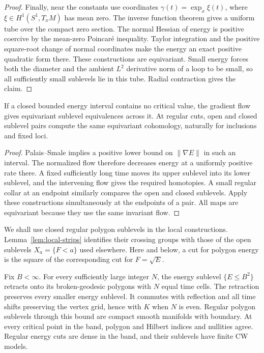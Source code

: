 \begin{proof}
Finally, near the constants use coordinates
\(\gamma(t)=\exp_x \xi(t)\), where \(\xi\in H^1(S^1,T_xM)\) has mean
zero.  The inverse function theorem gives a uniform tube over the
compact zero section.  The normal Hessian of energy is positive
coercive by the mean-zero Poincar\'e inequality.  Taylor integration
and the positive square-root change of normal coordinates make the
energy an exact positive quadratic form there.  These constructions
are equivariant.  Small energy forces both the diameter and the
ambient \(L^2\) derivative norm of a loop to be small, so all sufficiently
small sublevels lie in this tube.  Radial contraction gives the claim.
\end{proof}

\begin{lemma}\label{lem:local-strips}
If a closed bounded energy interval contains no critical value, the
gradient flow gives equivariant sublevel equivalences across it.  At
regular cuts, open and closed sublevel pairs compute the same
equivariant cohomology, naturally for inclusions and fixed loci.
\end{lemma}

\begin{proof}
Palais--Smale implies a positive lower bound on \(\|\nabla E\|\) in
such an interval.  The normalized flow therefore decreases energy at
a uniformly positive rate there.  A fixed sufficiently long time
moves its upper sublevel into its lower sublevel, and the intervening
flow gives the required homotopies.  A small regular collar at an
endpoint similarly compares the open and closed sublevels.  Apply
these constructions simultaneously at the endpoints of a pair.
All maps are equivariant because they use the same invariant flow.
\end{proof}

We shall use closed regular polygon sublevels in the local
constructions.  Lemma~\ref{lem:local-strips} identifies their crossing
groups with those of the open sublevels \(X_a=\{F<a\}\) used elsewhere.
Here and below, a cut for polygon energy is the square of the
corresponding cut for \(F=\sqrt E\).

\begin{lemma}\label{lem:local-polygons}
Fix \(B<\infty\).  For every sufficiently large integer \(N\), the
energy sublevel \(\{E\le B^2\}\) retracts onto its broken-geodesic
polygons with \(N\) equal time cells.  The retraction preserves every
smaller energy sublevel.  It commutes with reflection and all time
shifts preserving the vertex grid, hence with \(K\) when \(N\) is even.
Regular polygon sublevels through this bound are compact smooth
manifolds with boundary.
At every critical point in the band, polygon and Hilbert indices and
nullities agree.  Regular energy cuts are dense in the band, and
their sublevels have finite CW models.
\end{lemma}


